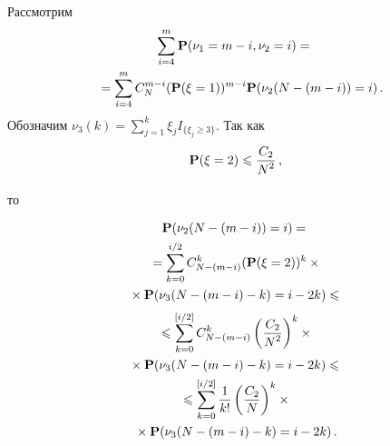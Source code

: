 \begin{multicols}{2}
Рассмотрим
\begin{multline*}
\sum\limits_{i=4}^m {\bf P}(\nu_1=m-i, \nu_2=i)={}\\
{}=\sum\limits_{i=4}^m C_{N}^{m-i}({\bf P}(\xi=1))^{m-i}{\bf P}(\nu_2(N-(m-i))=i)\,.\hspace*{-8pt}
\end{multline*}
Обозначим $\nu_3(k)=\sum\limits_{j=1}^k \xi_jI_{\{\xi_j\ge 3\}}$. Так как
 $$
 {\bf P}(\xi=2)\le \fr{C_2}{N^2}\,,
 $$

 \vspace*{-5pt}

 \noindent
  то
  \vspace*{-2pt}

  \noindent
\begin{multline*}
{\bf P}(\nu_2(N-(m-i))=i) ={}\\
{}=
\sum\limits_{k=0}^{i/2}
C^k_{N-(m-i)}({\bf P}(\xi=2))^k\times{}\\
{}\times
{\bf P}(\nu_3(N-(m-i)-k)=i-2k)\le{}
\end{multline*}
\noindent
\begin{multline}
{}\le \sum\limits_{k=0}^{[ i/2]}
C^k_{N-(m-i)}\left(\fr{C_2}{N^2}\right)^k \times{}\\
{}\times {\bf P}(\nu_3(N-(m-i)-k)=i-2k)\le{}\\
{}\le
\sum\limits_{k=0}^{[i/2]}
\fr{1}{k!}\left(\fr{C_2}{N}\right)^k\times{}\\
{}\times {\bf P}(\nu_3(N-(m-i)-k)=i-2k)\,.
 \label{c14}
\end{multline}


\end{multicols}
